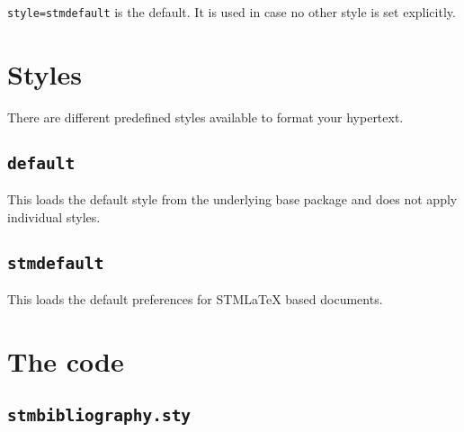 \texttt{style=stmdefault} is the default. It is used in case no other style is set explicitly.

\section{Styles}
\label{sec:styles}

There are different predefined styles available to format your hypertext.

\subsection{\protect\texttt{default}}
\label{sec:styles:default}

This loads the default style from the underlying base package and does not apply individual styles.

\subsection{\protect\texttt{stmdefault}}
\label{sec:styles:stmdefault}

This loads the default preferences for STM\LaTeX{} based documents.

\printbibliography

\printstmindex

\newpage
\appendix

\section{The code}
\label{sec:code}

\subsection{\protect\texttt{stmbibliography.sty}}
\label{sec:code:main}





